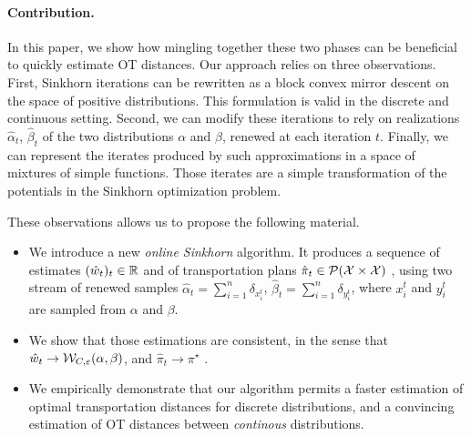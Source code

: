

\paragraph{Contribution.}

In this paper, we show how mingling together these two phases can be beneficial
to quickly estimate OT distances.  Our approach relies on three observations. First,
Sinkhorn iterations can be rewritten as a block convex mirror descent on the
space of positive distributions. This formulation is valid in the discrete and
continuous setting. Second, we can modify these iterations to rely on
realizations $\hat \alpha_t$, $\hat \beta_t$ of the two distributions $\alpha$
and $\beta$, renewed at each iteration $t$. Finally, we can represent the
iterates produced by such approximations in a space of mixtures of simple
functions. Those iterates are a simple transformation of the potentials in the
Sinkhorn optimization problem.

These observations allows us to propose the following
material.
\begin{itemize}
    \item We introduce a new \textit{online Sinkhorn} algorithm. It produces a sequence of
    estimates $(\hat w_t)_t \in \mathbb{R}$ and of transportation plans $\hat \pi_t \in
    \mathcal{P}(\mathcal{X} \times \mathcal{X})$ , using two stream of renewed samples $\hat \alpha_t =
    \sum_{i=1}^n \delta_{x^t_i}$, $\hat \beta_t = \sum_{i=1}^n \delta_{y^t_i}$,
    where $x^t_i$ and $y^t_i$ are sampled from $\alpha$ and $\beta$.
    \item We show that those estimations are consistent, in the sense that $\hat
    w_t \to \mathcal{W}_{C,\varepsilon}(\alpha, \beta)$, and $\hat \pi_t \to \pi^\star$ .
    \item We empirically demonstrate that our algorithm permits a faster
    estimation of optimal transportation distances for discrete distributions,
    and a convincing estimation of OT distances between \textit{continous} distributions.
\end{itemize}

